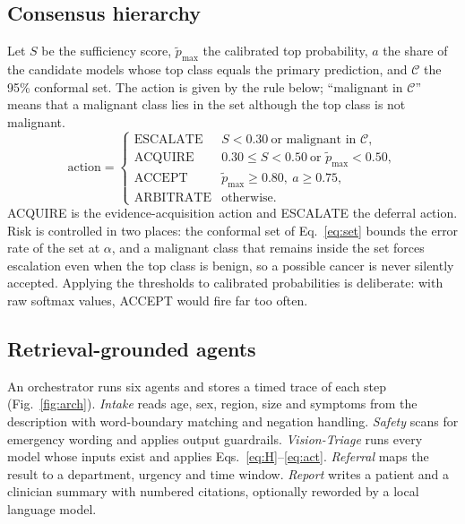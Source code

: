 \documentclass[conference]{IEEEtran}
\begin{document}
\subsection{Consensus hierarchy}
Let $S$ be the sufficiency score, $\tilde p_{\max}$ the calibrated top probability, $a$ the share of the candidate models whose top class equals the primary prediction, and $\mathcal C$ the 95\% conformal set. The action is given by the rule below; ``malignant in $\mathcal C$'' means that a malignant class lies in the set although the top class is not malignant.
\begin{equation}
\mathrm{action}=
\begin{cases}
\text{ESCALATE} & S<0.30\ \text{or malignant in }\mathcal C,\\
\text{ACQUIRE} & 0.30\le S<0.50\ \text{or }\tilde p_{\max}<0.50,\\
\text{ACCEPT} & \tilde p_{\max}\ge 0.80,\ a\ge 0.75,\\
\text{ARBITRATE} & \text{otherwise.}
\end{cases}
\label{eq:act}
\end{equation}
ACQUIRE is the evidence-acquisition action and ESCALATE the deferral action. Risk is controlled in two places: the conformal set of Eq.~\eqref{eq:set} bounds the error rate of the set at $\alpha$, and a malignant class that remains inside the set forces escalation even when the top class is benign, so a possible cancer is never silently accepted. Applying the thresholds to calibrated probabilities is deliberate: with raw softmax values, ACCEPT would fire far too often.

\subsection{Retrieval-grounded agents}
An orchestrator runs six agents and stores a timed trace of each step (Fig.~\ref{fig:arch}). \textit{Intake} reads age, sex, region, size and symptoms from the description with word-boundary matching and negation handling. \textit{Safety} scans for emergency wording and applies output guardrails. \textit{Vision-Triage} runs every model whose inputs exist and applies Eqs.~\eqref{eq:H}--\eqref{eq:act}. \textit{Referral} maps the result to a department, urgency and time window. \textit{Report} writes a patient and a clinician summary with numbered citations, optionally reworded by a local language model.
\end{document}
